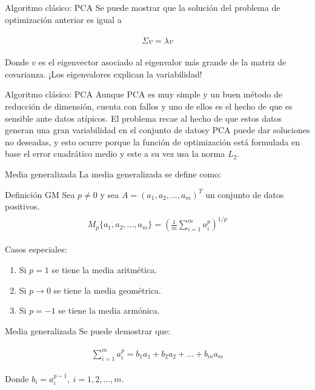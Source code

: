 \documentclass{beamer}
\begin{document}
\begin{frame}{Algoritmo clásico: PCA}
	Se puede mostrar que la solución del problema de optimización anterior es igual a
	
	\begin{align}
	\label{eqn:eqlabel}
	\begin{split}
			\Sigma v = \lambda v
	\end{split}
	\end{align}
	
	Donde $v$ es el eigenvector asociado al eigenvalor más grande de la matriz de covarianza. ¡Los eigenvalores explican la variabilidad!
\end{frame}

\begin{frame}{Algoritmo clásico: PCA}
	Aunque PCA es muy simple y un buen método de reducción de dimensión, cuenta con fallos y uno de ellos es el hecho de que es sensible ante datos atípicos. El problema recae al hecho de que estos datos generan una gran variabilidad en el conjunto de datosy PCA puede dar soluciones no deseadas, y esto ocurre porque la función de optimización está formulada en base el error cuadrático medio y este a su vez usa la norma $L_2$.
\end{frame}

\begin{frame}{Media generalizada}
	La media generalizada se define como:
	
	\begin{block}{Definición GM}
		Sea $p \neq 0$ y sea $A = (a_1, a_2, ..., a_m)^T$ un conjunto de datos positivos.
		\begin{align}
		\label{eqn:eqlabel}
		\begin{split}
			M_p\{a_1, a_2, ..., a_m\} = (\frac{1}{m} \sum_{i = 1}^m a_i^p)^{1/p}
		\end{split}
		\end{align}
	\end{block}
	
	Casos especiales:
	\begin{enumerate}
		\item Si $p = 1$ se tiene la media aritmética.
		\item Si $p \rightarrow 0$ se tiene la media geométrica.
		\item Si $p = -1$ se tiene la media armónica.
	\end{enumerate}
\end{frame}

\begin{frame}{Media generalizada}
	Se puede demostrar que:
	
	\begin{align}
	\label{eqn:eqlabel}
	\begin{split}
		\sum_{i = 1}^m a_i^p = b_1 a_1 + b_2 a_2 + ... + b_m a_m
	\end{split}
	\end{align}
	
	Donde $b_i = a_i^{p - 1},\ i = 1, 2, ..., m$.
\end{frame}
\end{document}
